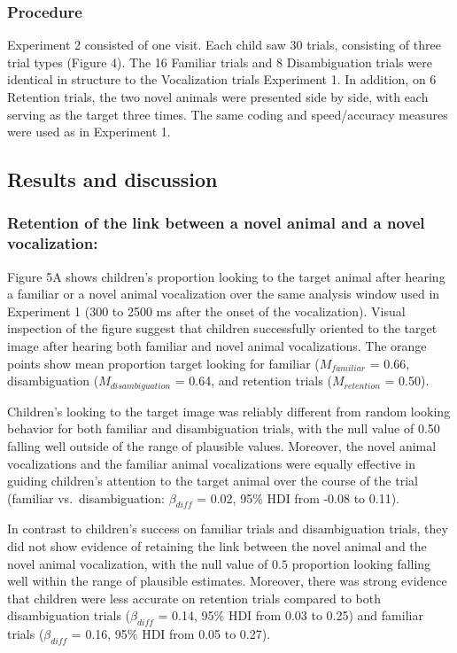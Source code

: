 \documentclass[english,floatsintext,man]{apa6}
\theoremstyle{definition}
\theoremstyle{definition}
\theoremstyle{definition}
\theoremstyle{remark}
\begin{document}
\subsubsection{Procedure}\label{procedure-1}

Experiment 2 consisted of one visit. Each child saw 30 trials,
consisting of three trial types (Figure 4). The 16 Familiar trials and 8
Disambiguation trials were identical in structure to the Vocalization
trials Experiment 1. In addition, on 6 Retention trials, the two novel
animals were presented side by side, with each serving as the target
three times. The same coding and speed/accuracy measures were used as in
Experiment 1.

\subsection{Results and discussion}\label{results-and-discussion-1}

\subsubsection{Retention of the link between a novel animal and a novel
vocalization:}\label{retention-of-the-link-between-a-novel-animal-and-a-novel-vocalization}

Figure 5A shows children's proportion looking to the target animal after
hearing a familiar or a novel animal vocalization over the same analysis
window used in Experiment 1 (300 to 2500 ms after the onset of the
vocalization). Visual inspection of the figure suggest that children
successfully oriented to the target image after hearing both familiar
and novel animal vocalizations. The orange points show mean proportion
target looking for familiar (\(M_{familiar}\) = 0.66, disambiguation
(\(M_{disambiguation}\) = 0.64, and retention trials (\(M_{retention}\)
= 0.50).

Children's looking to the target image was reliably different from
random looking behavior for both familiar and disambiguation trials,
with the null value of 0.50 falling well outside of the range of
plausible values. Moreover, the novel animal vocalizations and the
familiar animal vocalizations were equally effective in guiding
children's attention to the target animal over the course of the trial
(familiar vs.~disambiguation: \(\beta_{diff}\) = 0.02, 95\% HDI from
-0.08 to 0.11).

In contrast to children's success on familiar trials and disambiguation
trials, they did not show evidence of retaining the link between the
novel animal and the novel animal vocalization, with the null value of
\(0.5\) proportion looking falling well within the range of plausible
estimates. Moreover, there was strong evidence that children were less
accurate on retention trials compared to both disambiguation trials
(\(\beta_{diff}\) = 0.14, 95\% HDI from 0.03 to 0.25) and familiar
trials (\(\beta_{diff}\) = 0.16, 95\% HDI from 0.05 to 0.27).
\end{document}
